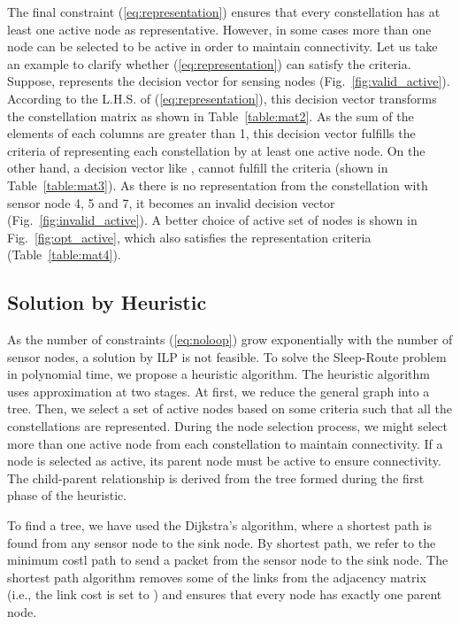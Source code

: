 \documentclass[conference]{IEEEtran}
\begin{document}
The final constraint (\ref{eq:representation}) ensures that every constellation has at least one active node as representative. However, in some cases more than one node can be selected to be active in order to maintain connectivity. Let us take an example to clarify whether (\ref{eq:representation}) can satisfy the criteria. Suppose,  represents the decision vector for sensing nodes (Fig.~\ref{fig:valid_active}). According to the L.H.S. of (\ref{eq:representation}), this decision vector transforms the constellation matrix as shown in Table~\ref{table:mat2}. As the sum of the elements of each columns are greater than 1, this decision vector fulfills the criteria of representing each constellation by at least one active node. On the other hand, a decision vector like , cannot fulfill the criteria (shown in Table~\ref{table:mat3}). As there is no representation from the constellation with sensor node 4, 5 and 7, it becomes an invalid decision vector (Fig.~\ref{fig:invalid_active}). A better choice of active set of nodes is shown in Fig.~\ref{fig:opt_active}, which also satisfies the representation criteria (Table~\ref{table:mat4}). 



\subsection{Solution by Heuristic}
As the number of constraints (\ref{eq:noloop}) grow exponentially with the number of sensor nodes, a solution by ILP is not feasible. To solve the Sleep-Route problem in polynomial time, we propose a heuristic algorithm. The heuristic algorithm uses approximation at two stages. At first, we reduce the general graph into a tree. Then, we select a set of active nodes based on some criteria such that all the constellations are represented. During the node selection process, we might select more than one active node from each constellation to maintain connectivity. If a node is selected as active, its parent node must be active to ensure connectivity. The child-parent relationship is derived from the tree formed during the first phase of the heuristic.

To find a tree, we have used the Dijkstra's algorithm, where a shortest path is found from any sensor node to the sink node. By shortest path, we refer to the minimum costl path to send a packet from the sensor node to the sink node. The shortest path algorithm removes some of the links from the adjacency matrix (i.e., the link cost is set to ) and ensures that every node has exactly one parent node.
\end{document}
